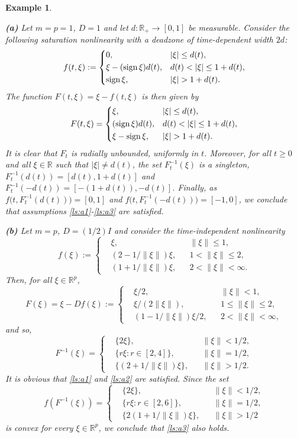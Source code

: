 \documentclass[a4paper,11pt]{article}
\newcommand{\R}{\mathbb R}
\numberwithin{equation}{section}
\numberwithin{figure}{section}
\numberwithin{table}{section}
\newtheorem{example}[theorem]{Example}
\begin{document}
\begin{example}
\begin{rm}
{\bf (a)}
Let $m=p=1$, $D=1$ and let $d:\R_+\to[0,1]$ be measurable. Consider the following saturation nonlinearity with a deadzone of time-dependent width $2d$:
\[
f(t,\xi):=\left\{ \begin{aligned} & 0, & & |\xi|\leq d(t),\\
& \xi-({\rm sign}\,\xi)d(t), & & d(t)<|\xi|\leq 1+d(t),\\
& {\rm sign}\,\xi, & & |\xi|>1+d(t).
\end{aligned} \right.
\]
The function $F(t,\xi)=\xi-f(t,\xi)$ is then given by
\[
F(t,\xi)=\left\{ \begin{aligned} & \xi, & & |\xi|\leq d(t),\\
& ({\rm sign}\,\xi)d(t), & & d(t)<|\xi|\leq 1+d(t),\\
& \xi-{\rm sign}\,\xi, & & |\xi|>1+d(t).
\end{aligned} \right.
\]
It is clear that $F_t$ is radially unbounded, uniformly in $t$. Moreover, for all $t\geq 0$ and all $\xi\in\R$ such that $|\xi|\not=d(t)$, the set $F_t^{-1}(\xi)$ is a singleton, $F_t^{-1}(d(t))=[d(t),1+d(t)]$ and $F_t^{-1}(-d(t))=[-(1+d(t)),-d(t)]$. Finally, as $f\big(t,F_t^{-1}(d(t))\big)=[0,1]$ and $f\big(t,F_t^{-1}(-d(t))\big)=[-1,0]$, we conclude
that assumptions \ref{ls:a1}-\ref{ls:a3} are satisfied.

{\bf (b)} Let $m=p$, $D=(1/2)I$ and consider the time-independent nonlinearity
\[
f(\xi):=\left\{ \begin{aligned} & \xi, & & \|\xi\|\leq 1,\\
& (2-1/\|\xi\|)\xi, & & 1<\|\xi\|\leq 2,\\
& (1+1/\|\xi\|)\xi, & & 2<\|\xi\|<\infty.\end{aligned} \right.
\]
Then, for all $\xi\in\R^p$,
\[
F(\xi)=\xi-Df(\xi):=\left\{ \begin{aligned} & \xi/2, & & \|\xi\|<1,\\
& \xi/(2\|\xi\|), & & 1\leq\|\xi\|\leq 2,\\
& (1-1/\|\xi\|)\xi/2, & & 2<\|\xi\|<\infty,\end{aligned} \right.
\]
and so,
\[
F^{-1}(\xi)=\left\{ \begin{aligned} & \{2\xi\}, & & \|\xi\|<1/2,\\
& \{r\xi:r\in[2,4]\}, & & \|\xi\|=1/2,\\
& \{(2+1/\|\xi\|)\xi\}, & & \|\xi\|>1/2.
\end{aligned} \right.
\]
It is obvious that \ref{ls:a1} and \ref{ls:a2} are satisfied. Since
the set
\[
f(F^{-1}(\xi))=\left\{ \begin{aligned} & \{2\xi\}, & & \|\xi\|<1/2,\\
& \{r\xi:r\in[2,6]\}, & & \|\xi\|=1/2,\\
& \{2(1+1/\|\xi\|)\xi\}, & & \|\xi\|>1/2
\end{aligned} \right.
\]
is convex for every $\xi\in\R^p$, we conclude that \ref{ls:a3} also holds.


\end{rm}
\end{example}
\end{document}
